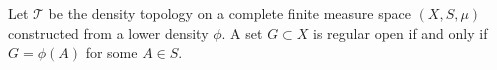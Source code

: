 Let $\mathcal{T}$ be the density topology on a complete finite measure space $(X, S, \mu)$ constructed from a lower density $\phi$. A set $G \subset X$ is regular open if and only if $G = \phi(A)$ for some $A \in S$.
